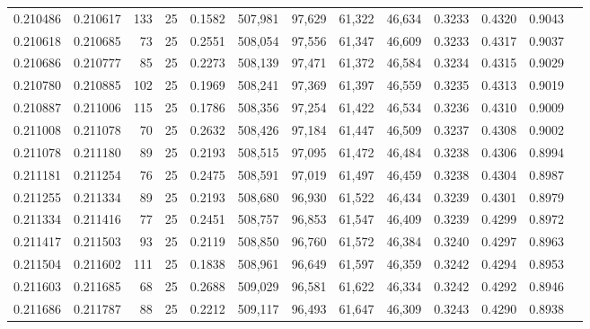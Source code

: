 \begin{tabular}{rrrrrrrrrrrrr}
0.210486 & 0.210617 &   133 &  25 &                                     0.1582 & 507,981 &  97,629 &  61,322 &  46,634 & 0.3233 & 0.4320 & 0.9043 \\
0.210618 & 0.210685 &    73 &  25 &                                     0.2551 & 508,054 &  97,556 &  61,347 &  46,609 & 0.3233 & 0.4317 & 0.9037 \\
0.210686 & 0.210777 &    85 &  25 &                                     0.2273 & 508,139 &  97,471 &  61,372 &  46,584 & 0.3234 & 0.4315 & 0.9029 \\
0.210780 & 0.210885 &   102 &  25 &                                     0.1969 & 508,241 &  97,369 &  61,397 &  46,559 & 0.3235 & 0.4313 & 0.9019 \\
0.210887 & 0.211006 &   115 &  25 &                                     0.1786 & 508,356 &  97,254 &  61,422 &  46,534 & 0.3236 & 0.4310 & 0.9009 \\
0.211008 & 0.211078 &    70 &  25 &                                     0.2632 & 508,426 &  97,184 &  61,447 &  46,509 & 0.3237 & 0.4308 & 0.9002 \\
0.211078 & 0.211180 &    89 &  25 &                                     0.2193 & 508,515 &  97,095 &  61,472 &  46,484 & 0.3238 & 0.4306 & 0.8994 \\
0.211181 & 0.211254 &    76 &  25 &                                     0.2475 & 508,591 &  97,019 &  61,497 &  46,459 & 0.3238 & 0.4304 & 0.8987 \\
0.211255 & 0.211334 &    89 &  25 &                                     0.2193 & 508,680 &  96,930 &  61,522 &  46,434 & 0.3239 & 0.4301 & 0.8979 \\
0.211334 & 0.211416 &    77 &  25 &                                     0.2451 & 508,757 &  96,853 &  61,547 &  46,409 & 0.3239 & 0.4299 & 0.8972 \\
0.211417 & 0.211503 &    93 &  25 &                                     0.2119 & 508,850 &  96,760 &  61,572 &  46,384 & 0.3240 & 0.4297 & 0.8963 \\
0.211504 & 0.211602 &   111 &  25 &                                     0.1838 & 508,961 &  96,649 &  61,597 &  46,359 & 0.3242 & 0.4294 & 0.8953 \\
0.211603 & 0.211685 &    68 &  25 &                                     0.2688 & 509,029 &  96,581 &  61,622 &  46,334 & 0.3242 & 0.4292 & 0.8946 \\
0.211686 & 0.211787 &    88 &  25 &                                     0.2212 & 509,117 &  96,493 &  61,647 &  46,309 & 0.3243 & 0.4290 & 0.8938 \\

\end{tabular}
